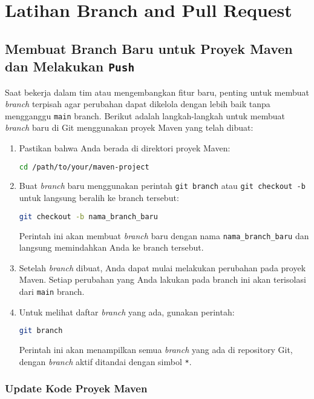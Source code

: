 \chapter{Latihan Branch and Pull Request}

\section{Membuat Branch Baru untuk Proyek Maven dan Mela\-kukan \texttt{Push}}

Saat bekerja dalam tim atau mengembangkan fitur baru, penting untuk membuat \textit{branch} terpisah agar perubahan dapat dikelola dengan lebih baik tanpa mengganggu \texttt{main} branch. Berikut adalah langkah-langkah untuk membuat \textit{branch} baru di Git menggunakan proyek Maven yang telah dibuat:

\begin{enumerate}
	\item Pastikan bahwa Anda berada di direktori proyek Maven:
	\begin{lstlisting}[language=bash]
		cd /path/to/your/maven-project
	\end{lstlisting}
	
	\item Buat \textit{branch} baru menggunakan perintah \texttt{git branch} atau \texttt{git checkout -b} untuk langsung beralih ke branch tersebut:
	\begin{lstlisting}[language=bash]
		git checkout -b nama_branch_baru
	\end{lstlisting}
	Perintah ini akan membuat \textit{branch} baru dengan nama \texttt{nama\_branch\_baru} dan langsung memindahkan Anda ke branch tersebut.
	
	\item Setelah \textit{branch} dibuat, Anda dapat mulai melakukan perubahan pada proyek Maven. Setiap perubahan yang Anda lakukan pada branch ini akan terisolasi dari \texttt{main} branch.
	
	\item Untuk melihat daftar \textit{branch} yang ada, gunakan perintah:
	\begin{lstlisting}[language=bash]
		git branch
	\end{lstlisting}
	Perintah ini akan menampilkan semua \textit{branch} yang ada di repository Git, dengan \textit{branch} aktif ditandai dengan simbol \texttt{*}.
\end{enumerate}

\subsection{Update Kode Proyek Maven}


